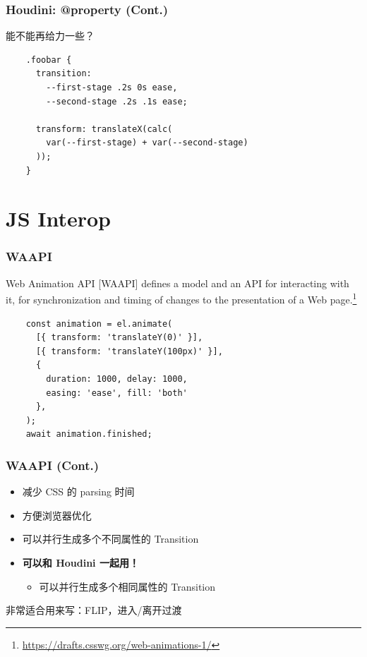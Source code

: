 \documentclass[UTF-8]{ctexbeamer}
\begin{document}
\begin{frame}[fragile]
  \frametitle{Houdini: @property (Cont.)}

  能不能再给力一些？

  \pause
  \vspace{2em}

  \begin{verbatim}
    .foobar {
      transition:
        --first-stage .2s 0s ease,
        --second-stage .2s .1s ease;

      transform: translateX(calc(
        var(--first-stage) + var(--second-stage)
      ));
    }
  \end{verbatim}
\end{frame}

\section{JS Interop}

\begin{frame}[fragile]
  \frametitle{WAAPI}

  \begin{block}{Web Animation API}
    [WAAPI] defines a model and an API for interacting with it, for synchronization and timing of changes to the presentation of a Web page.\footnote{\url{https://drafts.csswg.org/web-animations-1/}}
  \end{block}

  \pause

  \begin{verbatim}
    const animation = el.animate(
      [{ transform: 'translateY(0)' }],
      [{ transform: 'translateY(100px)' }],
      {
        duration: 1000, delay: 1000,
        easing: 'ease', fill: 'both'
      },
    );
    await animation.finished;
  \end{verbatim}
\end{frame}

\begin{frame}
  \frametitle{WAAPI (Cont.)}

  \begin{itemize}
    \item 减少 CSS 的 parsing 时间
    \item 方便浏览器优化
    \pause
    \item 可以并行生成多个不同属性的 Transition
    \pause
    \item \textbf{可以和 Houdini 一起用！}
    \pause
    \begin{itemize}
      \item 可以并行生成多个相同属性的 Transition
    \end{itemize}
  \end{itemize}
  
  \pause
  \vspace{2em}

  非常适合用来写：FLIP，进入/离开过渡
\end{frame}
\end{document}
